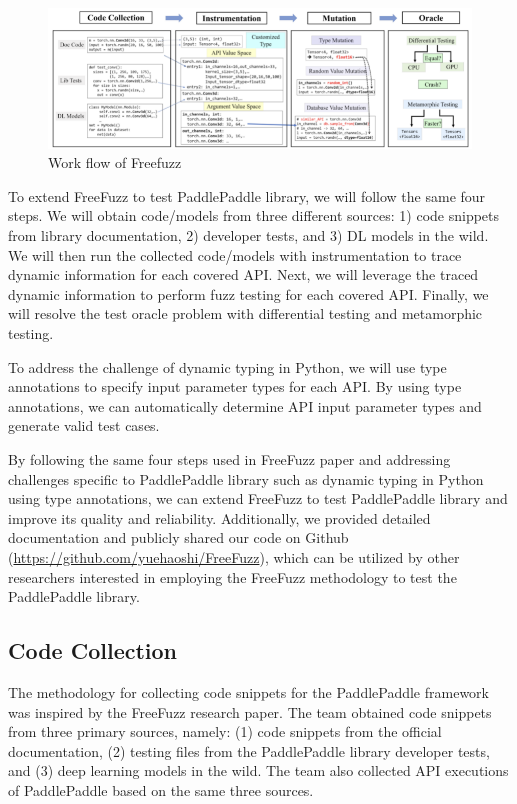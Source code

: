 \documentclass[sigconf]{acmart}
\begin{document}
\begin{figure}[h]
  \centering
  \includegraphics[width=\linewidth]{1.png}
  \caption{Work flow of Freefuzz}
\end{figure}

To extend FreeFuzz to test PaddlePaddle library, we will follow the same four steps. 
We will obtain code/models from three different sources: 1) code snippets from library documentation, 2) developer tests, and 3) DL models in the wild. 
We will then run the collected code/models with instrumentation to trace dynamic information for each covered API. 
Next, we will leverage the traced dynamic information to perform fuzz testing for each covered API. 
Finally, we will resolve the test oracle problem with differential testing and metamorphic testing.

To address the challenge of dynamic typing in Python, we will use type annotations to specify input parameter types for each API. 
By using type annotations, we can automatically determine API input parameter types and generate valid test cases.

By following the same four steps used in FreeFuzz paper and addressing challenges specific to PaddlePaddle library such as dynamic typing in Python using type annotations, 
we can extend FreeFuzz to test PaddlePaddle library and improve its quality and reliability. Additionally, we provided detailed documentation and publicly shared our code on Github (\href{https://github.com/yuehaoshi/FreeFuzz}{https://github.com/yuehaoshi/FreeFuzz}), 
which can be utilized by other researchers interested in employing the FreeFuzz methodology to test the PaddlePaddle library.
  
  \subsection{Code Collection}
  The methodology for collecting code snippets for the PaddlePaddle framework was inspired by the FreeFuzz research paper. 
  The team obtained code snippets from three primary sources, namely: (1) code snippets from the official documentation, 
  (2) testing files from the PaddlePaddle library developer tests, and (3) deep learning models in the wild. 
  The team also collected API executions of PaddlePaddle based on the same three sources.
\end{document}
